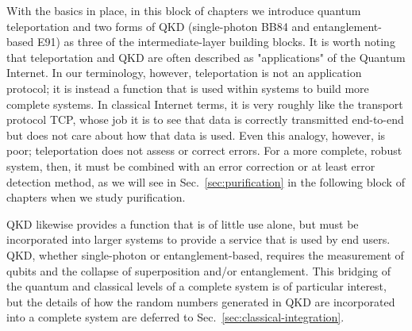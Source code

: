 
\begin{partintro}
With the basics in place, in this block of chapters we introduce quantum teleportation and two forms of QKD (single-photon BB84 and entanglement-based E91) as three of the intermediate-layer building blocks.  It is worth noting that teleportation and QKD are often described as "applications" of the Quantum Internet. In our terminology, however, teleportation is not an application protocol; it is instead a function that is used within systems to build more complete systems. In classical Internet terms, it is very roughly like the transport protocol TCP, whose job it is to see that data is correctly transmitted end-to-end but does not care about how that data is used. Even this analogy, however, is poor; teleportation does not assess or correct errors. For a more complete, robust system, then, it must be combined with an error correction or at least error detection method, as we will see in Sec.~\ref{sec:purification} in the following block of chapters when we study purification.

QKD likewise provides a function that is of little use alone, but must be incorporated into larger systems to provide a service that is used by end users. QKD, whether single-photon or entanglement-based, requires the measurement of qubits and the collapse of superposition and/or entanglement. This bridging of the quantum and classical levels of a complete system is of particular interest, but the details of how the random numbers generated in QKD are incorporated into a complete system are deferred to Sec.~\ref{sec:classical-integration}.
\end{partintro}
